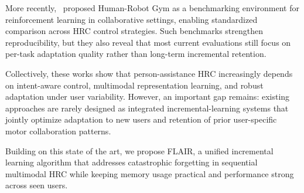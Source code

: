 \documentclass[3p,times,procedia]{elsarticle}
\begin{document}
More recently,~\cite{thumm2024hrgym} proposed Human-Robot Gym as a benchmarking environment for reinforcement learning in collaborative settings, enabling standardized comparison across HRC control strategies. Such benchmarks strengthen reproducibility, but they also reveal that most current evaluations still focus on per-task adaptation quality rather than long-term incremental retention.

Collectively, these works show that person-assistance HRC increasingly depends on intent-aware control, multimodal representation learning, and robust adaptation under user variability. However, an important gap remains: existing approaches are rarely designed as integrated incremental-learning systems that jointly optimize adaptation to new users and retention of prior user-specific motor collaboration patterns.

Building on this state of the art, we propose FLAIR, a unified incremental learning algorithm that addresses catastrophic forgetting in sequential multimodal HRC while keeping memory usage practical and performance strong across seen users.





\end{document}
